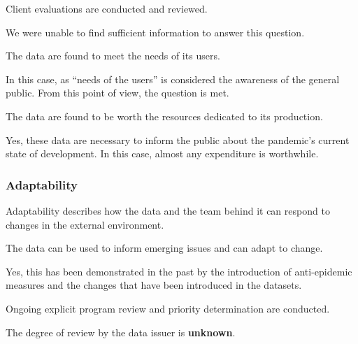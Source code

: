\begin{QandA}
    \item Client evaluations are conducted and reviewed.
    \begin{answered}
        We were unable to find sufficient information to answer this question.
    \end{answered}

    \item The data are found to meet the needs of its users.
    \begin{answered}
        In this case, as \enquote{needs of the users} is considered the awareness of the general public.
        From this point of view, the question is met.
    \end{answered}

    \item The data are found to be worth the resources dedicated to its production.
    \begin{answered}
        Yes, these data are necessary to inform the public about the pandemic's current state of development.
        In this case, almost any expenditure is worthwhile.
    \end{answered}

\end{QandA}

\subsubsection{Adaptability}

Adaptability describes how the data and the team behind it can respond to changes in the external environment.

\begin{QandA}
    \item The data can be used to inform emerging issues and can adapt to change.
    \begin{answered}
        Yes, this has been demonstrated in the past by the introduction of anti-epidemic measures and the changes that have been introduced in the datasets.
    \end{answered}

    \item Ongoing explicit program review and priority determination are conducted.
    \begin{answered}
        The degree of review by the data issuer is \textbf{unknown}.
    \end{answered}

\end{QandA}

